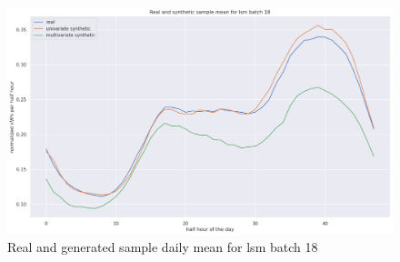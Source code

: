 \begin{figure}
    \centering
    \includegraphics[width=\textwidth]{images/lsm_dm_18.png}
    \caption{Real and generated sample daily mean for lsm batch 18}
    \label{fig:sample mean 22}
\end{figure}

